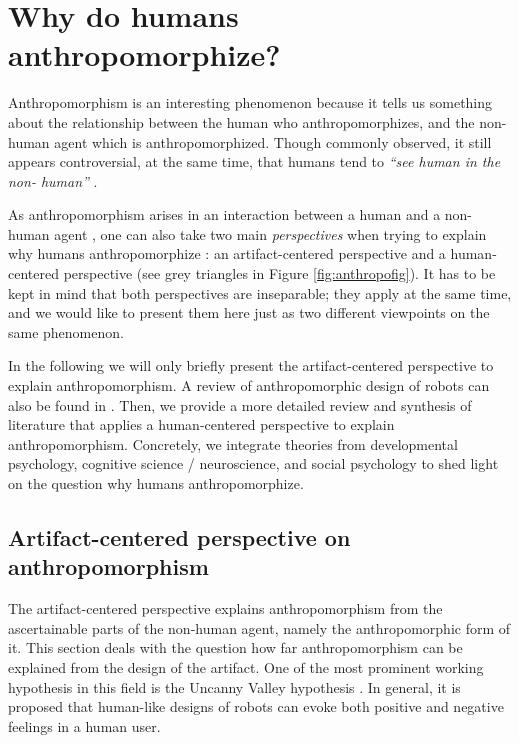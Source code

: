 \documentclass{frontiersSCNS} %
\begin{document}
\section{Why do humans anthropomorphize?}
\label{sec:anthropomorphism}

Anthropomorphism is an interesting phenomenon because it tells us something
about the relationship between the human who anthropomorphizes, and the
non-human agent which is anthropomorphized. Though commonly observed, it still
appears controversial, at the same time, that humans tend to \textit{``see human
in the non- human''} \citep{epley_seeing_2007}.

As anthropomorphism arises in an interaction between a human and a non-human
agent \citep{persson_anthropomorphism_2000}, one can also take two main
\textit{perspectives} when trying to explain why humans anthropomorphize
\citep{lee_human_2005}: an artifact-centered perspective and a human-centered
perspective (see grey triangles in Figure \ref{fig:anthropofig}). It has to be
kept in mind that both perspectives are inseparable; they apply at the same
time, and we would like to present them here just as two different viewpoints on
the same phenomenon.

In the following we will only briefly present the artifact-centered perspective
to explain anthropomorphism. A review of anthropomorphic design of robots can
also be found in \cite{fink_anthropomorphism_2012}. Then, we provide a more
detailed review and synthesis of literature that applies a human-centered
perspective to explain anthropomorphism. Concretely, we integrate theories from
developmental psychology, cognitive science / neuroscience, and social
psychology to shed light on the question why humans anthropomorphize.


\subsection{Artifact-centered perspective on anthropomorphism}

The artifact-centered perspective explains anthropomorphism from the
ascertainable parts of the non-human agent, namely the anthropomorphic form of
it. This section deals with the question how far anthropomorphism can be
explained from the design of the artifact.  One of the most prominent working
hypothesis in this field is the Uncanny Valley hypothesis
\citep{mori_uncanny_1970}. In general, it is proposed that human-like designs of
robots can evoke both positive and negative feelings in a human user. 
\end{document}
